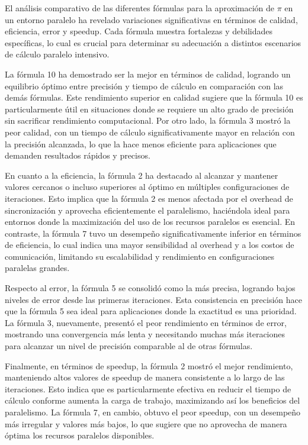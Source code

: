 \documentclass[conference, a4paper]{IEEEtran}
\begin{document}
El análisis comparativo de las diferentes fórmulas para la aproximación de \(\pi\) en un entorno paralelo ha revelado variaciones significativas en términos de calidad, eficiencia, error y speedup. Cada fórmula muestra fortalezas y debilidades específicas, lo cual es crucial para determinar su adecuación a distintos escenarios de cálculo paralelo intensivo.

La fórmula 10 ha demostrado ser la mejor en términos de calidad, logrando un equilibrio óptimo entre precisión y tiempo de cálculo en comparación con las demás fórmulas. Este rendimiento superior en calidad sugiere que la fórmula 10 es particularmente útil en situaciones donde se requiere un alto grado de precisión sin sacrificar rendimiento computacional. Por otro lado, la fórmula 3 mostró la peor calidad, con un tiempo de cálculo significativamente mayor en relación con la precisión alcanzada, lo que la hace menos eficiente para aplicaciones que demanden resultados rápidos y precisos.

En cuanto a la eficiencia, la fórmula 2 ha destacado al alcanzar y mantener valores cercanos o incluso superiores al óptimo en múltiples configuraciones de iteraciones. Esto implica que la fórmula 2 es menos afectada por el overhead de sincronización y aprovecha eficientemente el paralelismo, haciéndola ideal para entornos donde la maximización del uso de los recursos paralelos es esencial. En contraste, la fórmula 7 tuvo un desempeño significativamente inferior en términos de eficiencia, lo cual indica una mayor sensibilidad al overhead y a los costos de comunicación, limitando su escalabilidad y rendimiento en configuraciones paralelas grandes.

Respecto al error, la fórmula 5 se consolidó como la más precisa, logrando bajos niveles de error desde las primeras iteraciones. Esta consistencia en precisión hace que la fórmula 5 sea ideal para aplicaciones donde la exactitud es una prioridad. La fórmula 3, nuevamente, presentó el peor rendimiento en términos de error, mostrando una convergencia más lenta y necesitando muchas más iteraciones para alcanzar un nivel de precisión comparable al de otras fórmulas.

Finalmente, en términos de speedup, la fórmula 2 mostró el mejor rendimiento, manteniendo altos valores de speedup de manera consistente a lo largo de las iteraciones. Esto indica que es particularmente efectiva en reducir el tiempo de cálculo conforme aumenta la carga de trabajo, maximizando así los beneficios del paralelismo. La fórmula 7, en cambio, obtuvo el peor speedup, con un desempeño más irregular y valores más bajos, lo que sugiere que no aprovecha de manera óptima los recursos paralelos disponibles.
\end{document}
